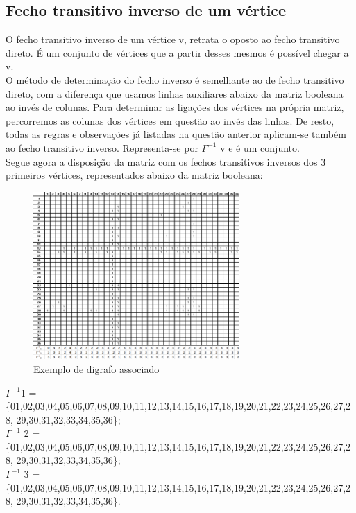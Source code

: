 \subsection{ Fecho transitivo inverso de um vértice }
O fecho transitivo inverso de um vértice v, retrata o oposto ao fecho transitivo direto. É um conjunto de 
vértices que a partir desses mesmos é possível chegar a v.\\
\indent O método de determinação do fecho inverso é semelhante ao de fecho transitivo direto, com a diferença 
que usamos linhas auxiliares abaixo da matriz booleana ao invés de colunas. Para determinar as ligações dos 
vértices na própria matriz, percorremos as colunas dos vértices em questão ao invés das linhas. De resto, todas as 
regras e observações já listadas na questão anterior aplicam-se também ao fecho transitivo inverso. Representa-se por $\Gamma^{-1}$ v e é um conjunto.\\ 
\indent Segue agora a disposição da matriz com os fechos transitivos inversos dos 3 primeiros vértices, representados abaixo da matriz booleana:
\begin{figure}[h]
    \centering
    \includegraphics[width=0.7\textwidth]{imgs/Figura15}
    \caption{Exemplo de digrafo associado\label{fig:imagem16}}
\end{figure}\clearpage
\indent $\Gamma^{-1}$1 =\\
\{01,02,03,04,05,06,07,08,09,10,11,12,13,14,15,16,17,18,19,20,21,22,23,24,25,26,27,28,
29,30,31,32,33,34,35,36\};\\
\indent $\Gamma^{-1}$ 2 =\\
\{01,02,03,04,05,06,07,08,09,10,11,12,13,14,15,16,17,18,19,20,21,22,23,24,25,26,27,28,
29,30,31,32,33,34,35,36\};\\
\indent $\Gamma^{-1}$ 3 =\\
\{01,02,03,04,05,06,07,08,09,10,11,12,13,14,15,16,17,18,19,20,21,22,23,24,25,26,27,28,
29,30,31,32,33,34,35,36\}.\\

